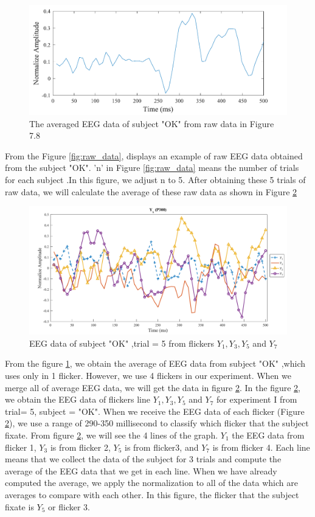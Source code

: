 \begin{figure}[ht]
	\centering
	\includegraphics[scale = 0.4]{chapter7/rawavg.pdf}
	\caption{The averaged EEG data of subject "OK" from raw data in Figure 7.8 }
	\label{fig:avg}
\end{figure}

From the Figure \ref{fig:raw_data}, displays an example of raw EEG data obtained from the  subject "OK". 'n' in Figure \ref{fig:raw_data} means the number of trials for each subject .In this figure, we adjust n to 5. After obtaining these 5 trials of raw data, we will calculate the average of these raw data as shown in Figure \ref{fig:yx}


\begin{figure}[ht]
	\centering
	\includegraphics[width=\textwidth]{chapter7/erp_result.pdf}
	\caption{EEG data of subject "OK" ,trial = 5 from flickers $Y_1,Y_3,Y_5$ and $Y_7$ }
		\label{fig:yx}
\end{figure}

From the figure \ref{fig:avg}, we obtain the average of EEG data from subject "OK" ,which uses only in 1 flicker. However, we use 4 flickers in our experiment. When we merge all of average EEG data, we will get the data in figure \ref{fig:yx}. In the figure \ref{fig:yx}, we obtain the EEG data of flickers line $Y_1,Y_3,Y_5$ and $Y_7$ for experiment I from trial= 5, subject = "OK". When we receive the EEG data of each flicker (Figure \ref{fig:yx}), we use a range of 290-350 millisecond to classify which flicker that the subject fixate. From figure \ref{fig:yx}, we will see the 4 lines of the graph. $Y_1$ the EEG data from flicker 1, $Y_3$ is from flicker 2, $Y_5$ is from flicker3, and $Y_7$ is from flicker 4. Each line means that we collect the data of the subject for 3 trials and compute the average of the EEG data that we get in each line. When we have already computed the average, we apply the normalization to all of the data which are averages to compare with each other. In this figure, the flicker that the subject fixate is $Y_5$ or flicker 3.

